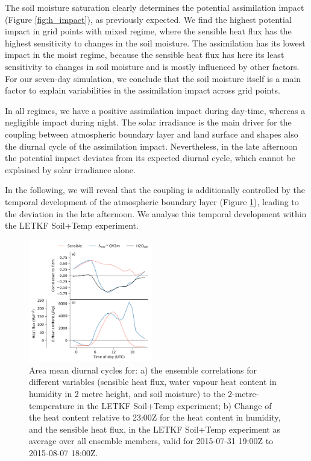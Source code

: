\documentclass[hess, manuscript]{copernicus}
\begin{document}
The soil moisture saturation clearly determines the potential assimilation impact (Figure \ref{fig:h_impact}), as previously expected.
We find the highest potential impact in grid points with mixed regime, where the sensible heat flux has the highest sensitivity to changes in the soil moisture.
The assimilation has its lowest impact in the moist regime, because the sensible heat flux has here its least sensitivity to changes in soil moisture and is mostly influenced by other factors.
For our seven-day simulation, we conclude that the soil moisture itself is a main factor to explain variabilities in the assimilation impact across grid points.

In all regimes, we have a positive assimilation impact during day-time, whereas a negligible impact during night.
The solar irradiance is the main driver for the coupling between atmospheric boundary layer and land surface and shapes also the diurnal cycle of the assimilation impact.
Nevertheless, in the late afternoon the potential impact deviates from its expected diurnal cycle, which cannot be explained by solar irradiance alone.

In the following, we will reveal that the coupling is additionally controlled by the temporal development of the atmospheric boundary layer (Figure \ref{fig:cycle_corr}), leading to the deviation in the late afternoon.
We analyse this temporal development within the LETKF Soil+Temp experiment.

\begin{figure}[ht]
	\includegraphics[width=0.48\textwidth]{figures/fig_10_cycle_corr.png}
	\caption{
		Area mean diurnal cycles for: a) the ensemble correlations for different variables (sensible heat flux, water vapour heat content in humidity in 2 metre height, and soil moisture) to the 2-metre-temperature in the LETKF Soil+Temp experiment; b) Change of the heat content relative to 23:00Z for the heat content in humidity, and the sensible heat flux, in the LETKF Soil+Temp experiment as average over all ensemble members, valid for 2015-07-31 19:00Z to 2015-08-07 18:00Z.
	}
	\label{fig:cycle_corr}
\end{figure}
\end{document}
